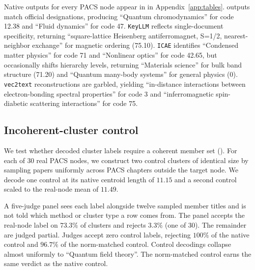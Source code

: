 Native outputs for every PACS node appear in  in Appendix~\ref{app:tables}.
\doctolora outputs match official designations, producing ``Quantum chromodynamics'' for code 12.38 and ``Fluid dynamics'' for code 47.
\texttt{KeyLLM} reflects single-document specificity, returning ``square-lattice Heisenberg antiferromagnet, S=1/2, nearest-neighbor exchange'' for magnetic ordering (75.10).
\texttt{ICAE} identifies ``Condensed matter physics'' for code 71 and ``Nonlinear optics'' for code 42.65, but occasionally shifts hierarchy levels, returning ``Materials science'' for bulk band structure (71.20) and ``Quantum many-body systems'' for general physics (0).
\texttt{vec2text} reconstructions are garbled, yielding ``in-distance interactions between electron-bonding spectral properties'' for code 3 and ``inferromagnetic spin-diabetic scattering interactions'' for code 75.

\subsection{Incoherent-cluster control}
\label{app:incoherent}

We test whether decoded cluster labels require a coherent member set ().
For each of $30$ real PACS nodes, we construct two control clusters of identical size by sampling papers uniformly across PACS chapters outside the target node.
We decode one control at its native centroid length of $11.15$ and a second control scaled to the real-node mean of $11.49$.

A five-judge panel sees each label alongside twelve sampled member titles and is not told which method or cluster type a row comes from.
The panel accepts the real-node label on $73.3\%$ of clusters and rejects $3.3\%$ (one of $30$).
The remainder are judged partial.
Judges accept zero control labels, rejecting $100\%$ of the native control and $96.7\%$ of the norm-matched control.
Control decodings collapse almost uniformly to ``Quantum field theory''.
The norm-matched control earns the same verdict as the native control.


\begin{table}[h]
\centering
\footnotesize
\caption{Scores from the blinded five-judge panel on the incoherent-cluster control experiment. \emph{PACS node (real)} denotes actual clusters, while the control rows consist of clusters of the same size sampled across different PACS chapters and decoded either at their native centroid norm or rescaled to the real nodes' norm. \emph{belongs=yes} and \emph{rejected} indicate the proportion of clusters whose label the panel accepted as valid for the members or rejected entirely. The rest were judged partial.}
\label{tab:incoherent}

\end{table}


